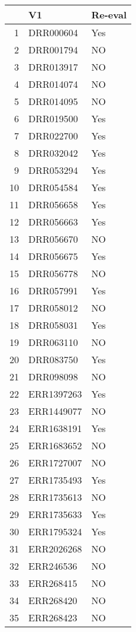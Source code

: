 \begin{table}[ht]
\centering
\begin{tabular}{rll}
  \hline
 & V1 & Re-eval \\ 
  \hline
1 & DRR000604 & Yes \\ 
  2 & DRR001794 & NO \\ 
  3 & DRR013917 & NO \\ 
  4 & DRR014074 & NO \\ 
  5 & DRR014095 & NO \\ 
  6 & DRR019500 & Yes \\ 
  7 & DRR022700 & Yes \\ 
  8 & DRR032042 & Yes \\ 
  9 & DRR053294 & Yes \\ 
  10 & DRR054584 & Yes \\ 
  11 & DRR056658 & Yes \\ 
  12 & DRR056663 & Yes \\ 
  13 & DRR056670 & NO \\ 
  14 & DRR056675 & Yes \\ 
  15 & DRR056778 & NO \\ 
  16 & DRR057991 & Yes \\ 
  17 & DRR058012 & NO \\ 
  18 & DRR058031 & Yes \\ 
  19 & DRR063110 & NO \\ 
  20 & DRR083750 & Yes \\ 
  21 & DRR098098 & NO \\ 
  22 & ERR1397263 & Yes \\ 
  23 & ERR1449077 & NO \\ 
  24 & ERR1638191 & Yes \\ 
  25 & ERR1683652 & NO \\ 
  26 & ERR1727007 & NO \\ 
  27 & ERR1735493 & Yes \\ 
  28 & ERR1735613 & NO \\ 
  29 & ERR1735633 & Yes \\ 
  30 & ERR1795324 & Yes \\ 
  31 & ERR2026268 & NO \\ 
  32 & ERR246536 & NO \\ 
  33 & ERR268415 & NO \\ 
  34 & ERR268420 & NO \\ 
  35 & ERR268423 & NO \\ 

\end{tabular}
\end{table}
